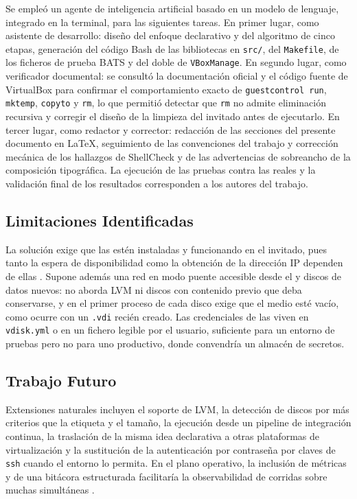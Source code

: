 Se empleó un agente de inteligencia artificial basado en un modelo de lenguaje, integrado en la terminal, para las siguientes tareas. En primer lugar, como asistente de desarrollo: diseño del enfoque declarativo y del algoritmo de cinco etapas, generación del código Bash de las bibliotecas en \texttt{src/}, del \texttt{Makefile}, de los ficheros de prueba BATS y del doble de \texttt{VBoxManage}. En segundo lugar, como verificador documental: se consultó la documentación oficial y el código fuente de VirtualBox para confirmar el comportamiento exacto de \texttt{guestcontrol run}, \texttt{mktemp}, \texttt{copyto} y \texttt{rm}, lo que permitió detectar que \texttt{rm} no admite eliminación recursiva y corregir el diseño de la limpieza del invitado antes de ejecutarlo. En tercer lugar, como redactor y corrector: redacción de las secciones del presente documento en \LaTeX{}, seguimiento de las convenciones del trabajo y corrección mecánica de los hallazgos de ShellCheck y de las advertencias de sobreancho de la composición tipográfica. La ejecución de las pruebas contra las \vm{} reales y la validación final de los resultados corresponden a los autores del trabajo.

\subsection{Limitaciones Identificadas}

La solución exige que las \guestadditions{} estén instaladas y funcionando en el invitado, pues tanto la espera de disponibilidad como la obtención de la dirección IP dependen de ellas \parencite{virtualbox_guestadditions}. Supone además una red en modo puente accesible desde el \host{} y discos de datos nuevos: no aborda LVM ni discos con contenido previo que deba conservarse, y en el primer proceso de cada disco exige que el medio esté vacío, como ocurre con un \texttt{.vdi} recién creado. Las credenciales de las \vm{} viven en \texttt{vdisk.yml} o en un fichero legible por el usuario, suficiente para un entorno de pruebas pero no para uno productivo, donde convendría un almacén de secretos.

\subsection{Trabajo Futuro}

Extensiones naturales incluyen el soporte de LVM, la detección de discos por más criterios que la etiqueta y el tamaño, la ejecución desde un pipeline de integración continua, la traslación de la misma idea declarativa a otras plataformas de virtualización y la sustitución de la autenticación por contraseña por claves de \texttt{ssh} cuando el entorno lo permita. En el plano operativo, la inclusión de métricas y de una bitácora estructurada facilitaría la observabilidad de corridas sobre muchas \vm{} simultáneas \parencite{ansible_up_running}.
